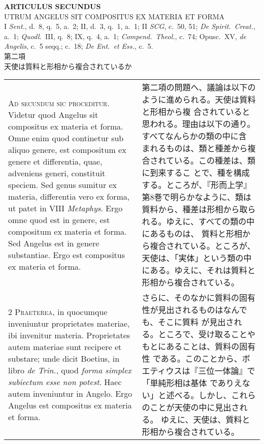 \documentclass[10pt]{jsarticle} %
\begin{document}
\begin{center}
 {\Large {\bf ARTICULUS SECUNDUS}}\\
 {\large UTRUM ANGELUS SIT COMPOSITUS EX MATERIA ET FORMA}\\
 {\footnotesize I {\itshape Sent.}, d.~8, q.~5, a.~2; II, d.~3, q.~1,
 a.~1; II {\itshape SCG}, c.~50, 51; {\itshape De Spirit.~Creat.}, a.~1;
 {\itshape Quodl.}~III, q.~8; IX, q.~4, a.~1; {\itshape
 Compend.~Theol.}, c.~74; Opusc.~XV, {\itshape de Angelis}, c.~5 seqq.;
 c.~18; {\itshape De Ent.~et Ess.}, c.~5.}\\
 {\Large 第二項\\天使は質料と形相から複合されているか}
\end{center}

\begin{longtable}{p{21em}p{21em}}

{\huge A}{\scshape d secundum sic proceditur}. Videtur quod Angelus sit
compositus ex materia et forma. Omne enim quod continetur sub aliquo
genere, est compositum ex genere et differentia, quae, adveniens generi,
constituit speciem. Sed genus sumitur ex materia, differentia vero ex
forma, ut patet in VIII {\itshape Metaphys}. Ergo omne quod est in
genere, est compositum ex materia et forma. Sed Angelus est in genere
substantiae. Ergo est compositus ex materia et forma.


&

 第二項の問題へ、議論は以下のように進められる。天使は質料と形相から複
 合されていると思われる。理由は以下の通り。すべてなんらかの類の中に含
 まれるものは、類と種差から複合されている。この種差は、類に到来するこ
 とで、種を構成する。ところが、『形而上学』第8巻で明らかなように、類は
 質料から、種差は形相から取られる。ゆえに、すべての類の中にあるものは、
 質料と形相から複合されている。ところが、天使は、「実体」という類の中
 にある。ゆえに、それは質料と形相から複合されている。

\\

{\scshape 2 Praeterea}, in quocumque inveniuntur proprietates
materiae, ibi invenitur materia. Proprietates autem materiae sunt
recipere et substare; unde dicit Boetius, in libro {\itshape de
Trin.}, quod {\itshape forma simplex subiectum esse non potest}. Haec
autem inveniuntur in Angelo. Ergo Angelus est compositus ex materia et
forma.

&

 さらに、そのなかに質料の固有性が見出されるものはなんでも、そこに質料
 が見出される。ところで、受け取ることやもとにあることは、質料の固有性
 である。このことから、ボエティウスは『三位一体論』で「単純形相は基体
 でありえない」と述べる。しかし、これらのことが天使の中に見出される。
 ゆえに、天使は、質料と形相から複合されている。


\end{longtable}
\end{document}
